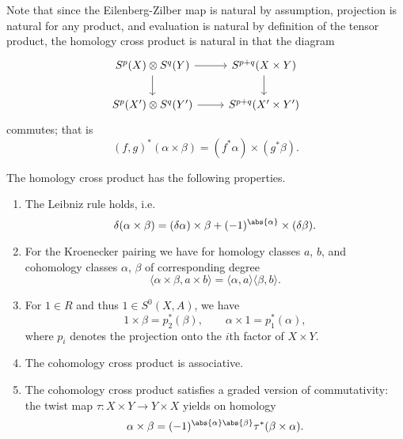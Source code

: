 \documentclass[main.tex]{subfiles}
\begin{document}
Note that since the Eilenberg-Zilber map is natural by assumption, projection is natural for any product, and evaluation is natural by definition of the tensor product, the homology cross product is natural in that the diagram
\begin{equation*}
  \begin{tikzcd}
    S^{p}(X) \otimes S^{q}(Y)
    \arrow[r]
    \arrow[d]
    & S^{p+q}(X \times Y)
    \arrow[d]
    \\
    S^{p}(X') \otimes S^{q}(Y')
    \arrow[r]
    & S^{p+q}(X' \times Y')
  \end{tikzcd}
\end{equation*}
commutes; that is
\begin{equation*}
  (f, g)^{*}(\alpha \times \beta) = (f^{*}\alpha) \times (g^{*}\beta).
\end{equation*}

\begin{fact}
  \label{fact:properties_of_homology_corss_product}
  The homology cross product has the following properties.
  \begin{enumerate}
    \item The Leibniz rule holds, i.e.\
      \begin{equation*}
        \delta(\alpha \times \beta) = (\delta \alpha) \times \beta + (-1)^{\abs{\alpha}} \times (\delta \beta).
      \end{equation*}

    \item For the Kroenecker pairing we have for homology classes \(a\), \(b\), and cohomology classes \(\alpha\), \(\beta\) of corresponding degree
      \begin{equation*}
        \langle \alpha \times \beta, a \times b \rangle = \langle \alpha, a \rangle\langle \beta, b \rangle.
      \end{equation*}

    \item For \(1 \in R\) and thus \(1 \in S^{0}(X, A)\), we have
      \begin{equation*}
        1 \times \beta = p_{2}^{*}(\beta), \qquad \alpha \times 1 = p^{*}_{1}(\alpha),
      \end{equation*}
      where \(p_{i}\) denotes the projection onto the \(i\)th factor of \(X \times Y\).

    \item The cohomology cross product is associative.

    \item The cohomology cross product satisfies a graded version of commutativity: the twist map \(\tau\colon X \times Y \to Y \times X\) yields on homology
      \begin{equation*}
        \alpha \times \beta = (-1)^{\abs{\alpha}\abs{\beta}} \tau^{*}(\beta \times \alpha).
      \end{equation*}
  \end{enumerate}
\end{fact}
\end{document}
